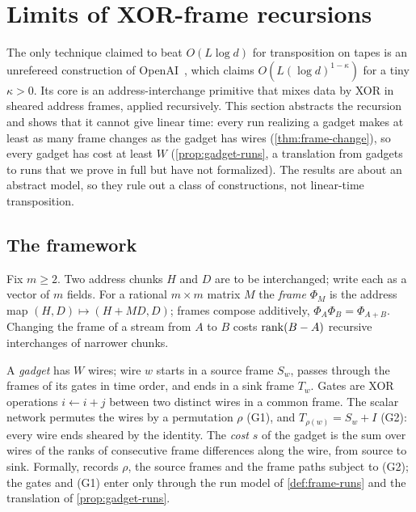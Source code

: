 \section{Limits of XOR-frame recursions}\label{sec:frames}

The only technique claimed to beat $O(L\log d)$ for transposition on tapes is an unrefereed
construction of OpenAI~\cite{OpenAI2026mult}, which claims $O(L(\log d)^{1-\kappa})$ for a tiny
$\kappa>0$. Its core is an address-interchange primitive that mixes data by XOR in sheared address
frames, applied recursively. This section abstracts the recursion and shows that it cannot give linear time: every run realizing a gadget makes at least as many frame changes as the gadget has wires (\cref{thm:frame-change}), so every gadget has cost at least $W$ (\cref{prop:gadget-runs}, a translation from gadgets to runs that we prove in full but have not formalized). The results are about an
abstract model, so they rule out a class of constructions, not linear-time transposition.

\subsection{The framework}

Fix $m\ge2$. Two address chunks $H$ and $D$ are to be interchanged; write each as a vector of $m$
fields. For a rational $m\times m$ matrix $M$ the \emph{frame} $\Phi_M$ is the address map
$(H,D)\mapsto(H+MD,D)$; frames compose additively, $\Phi_A\Phi_B=\Phi_{A+B}$. Changing the frame of a
stream from $A$ to $B$ costs $\operatorname{rank}(B-A)$ recursive interchanges of narrower chunks.

\begin{definition}[Gadget]\label{def:gadget}
A \emph{gadget} has $W$ wires; wire $w$ starts in a source frame $S_w$, passes through the frames of its
gates in time order, and ends in a sink frame $T_w$. Gates are XOR operations $i\leftarrow i+j$ between two distinct wires in a common frame. The scalar network permutes the wires by a permutation $\rho$ (G1), and
$T_{\rho(w)}=S_w+I$ (G2): every wire ends sheared by the identity. The \emph{cost} $s$ of the gadget is
the sum over wires of the ranks of consecutive frame differences along the wire, from source to sink.
Formally,  records $\rho$, the source frames and the frame paths subject to
(G2); the gates and (G1) enter only through the run model of \cref{def:frame-runs} and the translation of \cref{prop:gadget-runs}.
\end{definition}

